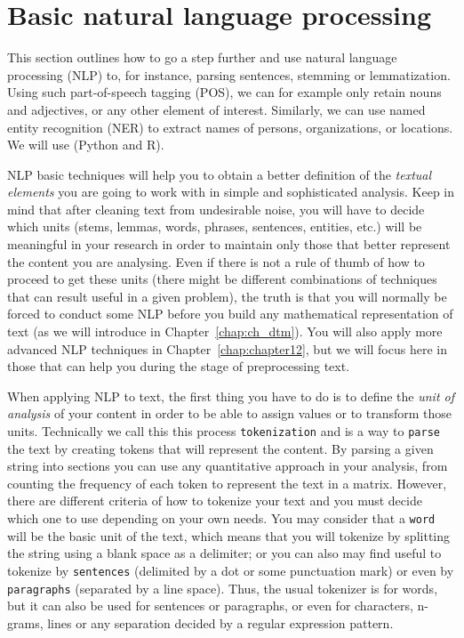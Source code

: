 \section{Basic natural language processing}
\label{sec:nlp}


This section outlines how to go a step further and use natural language processing (NLP) to, for instance, parsing sentences, stemming or lemmatization. Using such part-of-speech tagging (POS), we can for example only retain nouns and adjectives, or any other element of interest. Similarly, we can use named entity recognition (NER) to extract names of persons, organizations, or locations. We will use  (Python and R).

NLP basic techniques will help you to obtain a better definition of the \textit{textual elements} you are going to work with in simple and sophisticated analysis. Keep in mind that after cleaning text from undesirable noise, you will have to decide which units (stems, lemmas, words, phrases, sentences, entities, etc.) will be meaningful in your research in order to maintain only those that better represent the content you are analysing. Even if there is not a rule of thumb of how to proceed to get these units (there might be different combinations of techniques that can result useful in a given problem), the truth is that you will normally be forced to conduct some NLP before you build any mathematical representation of text (as we will introduce in Chapter~\ref{chap:ch_dtm}). You will also apply more advanced NLP techniques in Chapter~\ref{chap:chapter12}, but we will focus here in those that can help you during the stage of preprocessing text.

When applying NLP to text, the first thing you have to do is to define the \textit{unit of analysis} of your content in order to be able to assign values or to transform those units. Technically we call this this process \texttt{tokenization} and is a way to \texttt{parse} the text by creating tokens that will represent the content. By parsing a given string into sections you can use any quantitative approach in your analysis, from counting the frequency of each token to represent the text in a matrix. However, there are different criteria of how to tokenize your text and you must decide which one to use depending on your own needs. You may consider that a \texttt{word} will be the basic unit of the text, which means that you will tokenize by splitting the string using a blank space as a delimiter; or you can also may find useful to tokenize by \texttt{sentences} (delimited by a dot or some punctuation mark) or even by \texttt{paragraphs} (separated by a line space). Thus, the usual tokenizer is for words, but it can also be used for sentences or paragraphs, or even for characters, n-grams, lines or any separation decided by a regular expression pattern.

